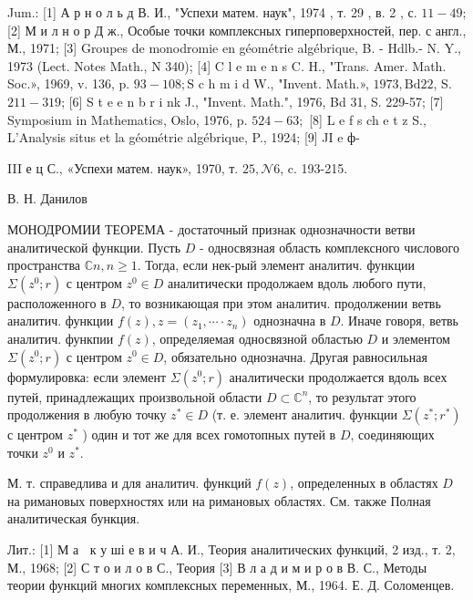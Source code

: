 \documentclass[10pt]{article}
\begin{document}
Jum.: [1] А р н о л ь д В. И., "Успехи матем. наук", 1974 , т. 29 , в. 2 , с. $11-49$; [2] М и л н о р Д ж., Особые точки комплексных гиперповерхностей, пер. с англ., М., 1971; [3] Groupes de monodromie en géométrie algébrique, B. - Hdlb.- N. Y., 1973 (Lect. Notes Math., N 340); [4] C l e m e n s C. H., "Trans. Amer. Math. Soc.», 1969, v. 136, p. $93-108 ; \mathrm{S}$ c h m i d W., "Invent. Math.», $1973, \mathrm{Bd} 22$, S. $211-319$; [6] S t e e n b r i nk J., "Invent. Math.", 1976, Bd 31, S. 229-57; [7] Symposium in Mathematics, Oslo, 1976, p. $524-63 ;$ [8] L e f s ch e t z S., L'Analysis situs et la géométrie algébrique, P., 1924; [9] JI e ф-

III е ц С., «Успехи матем. наук», 1970, т. $25, \mathcal{N} 6$, c. 193-215.



В. Н. Данилов



МОНОДРОМИИ ТЕОРЕМА - достаточный признак однозначности ветви аналитической функции. Пусть $D$ - односвязная область комплексного числового пространства $\mathbb{C} n, n \geqslant 1$. Тогда, если нек-рый элемент аналитич. функции $\Sigma\left(z^{0} ; r\right)$ с центром $z^{0} \in D$ аналитически продолжаем вдоль любого пути, расположенного в $D$, то возникающая при этом аналитич. продолжении ветвь аналитич. функции $f(z), z=\left(z_{1}, \cdots \cdot z_{n}\right)$ однозначна в $D$. Иначе говоря, ветвь аналитич. функпии $f(z)$, определяемая односвязной областью $D$ и элементом $\Sigma\left(z^{0} ; r\right)$ с центром $z^{0} \in D$, обязательно однозначна. Другая равносильная формулировка: если элемент $\Sigma\left(z^{0} ; r\right)$ аналитически продолжается вдоль всех путей, принадлежащих произвольной области $D \subset \mathbb{C}^{n}$, то результат этого продолжения в любую точку $z^{*} \in D$ (т. е. элемент аналитич. функции $\Sigma\left(z^{*} ; r^{*}\right)$ с центром $z^{*}$ ) один и тот же для всех гомотопных путей в $D$, соединяющих точки $z^{0}$ и $z^{*}$.



М. т. справедлива и для аналитич. функций $f(z)$, определенных в областях $D$ на римановых поверхностях или на римановых областях. См. также Полная аналитическая бункция.



Лит.: [1] М а $\mathbf{~}$ к у ші е в и ч А. И., Теория аналитических функций, 2 изд., т. 2, М., 1968; [2] С т о и л о в С., Теория [3] В л а д и м и р о в В. С., Методы теории функций многих комплексных переменных, М., 1964. Е. Д. Соломенцев.
\end{document}
